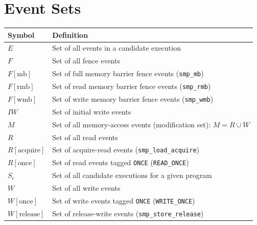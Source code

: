 \section*{Event Sets}
\begin{longtable}{p{2.5cm}p{8cm}}
    \toprule
    Symbol & Definition \\
    \midrule\endhead
    $E$                    & Set of all events in a candidate execution \\
    \midrule
    $F$                    & Set of all fence events \\
    \midrule
    $F[\text{mb}]$         & Set of full memory barrier fence events (\texttt{smp\_mb}) \\
    \midrule
    $F[\text{rmb}]$        & Set of read memory barrier fence events (\texttt{smp\_rmb}) \\
    \midrule
    $F[\text{wmb}]$        & Set of write memory barrier fence events (\texttt{smp\_wmb}) \\
    \midrule
    $IW$                   & Set of initial write events \\
    \midrule
    $M$                    & Set of all memory-access events (modification set): $M = R \cup W$ \\
    \midrule
    $R$                    & Set of all read events \\
    \midrule
    $R[\text{acquire}]$    & Set of acquire-read events (\texttt{smp\_load\_acquire}) \\
    \midrule
    $R[\text{once}]$       & Set of read events tagged \texttt{ONCE} (\texttt{READ\_ONCE}) \\
    \midrule
    $S_c$                  & Set of all candidate executions for a given program \\
    \midrule
    $W$                    & Set of all write events \\
    \midrule
    $W[\text{once}]$       & Set of write events tagged \texttt{ONCE} (\texttt{WRITE\_ONCE}) \\
    \midrule
    $W[\text{release}]$    & Set of release-write events (\texttt{smp\_store\_release}) \\
    \bottomrule
\end{longtable}


